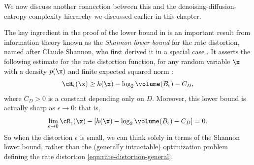 \documentclass[../../book-main.tex]{subfiles}
\begin{document}
We now discuss another connection between this and the
denoising-diffusion-entropy complexity hierarchy we discussed earlier in this
chapter.

\begin{remark}\label{rem:slb}
	The key ingredient in the proof of the lower bound in
	 is an important result from
	information theory known as the \textit{Shannon lower bound} for the rate
	distortion, named after Claude Shannon, who first derived it in a special case
	\cite{shannon1959coding}. It
	asserts the following estimate for the rate distortion function, for any random
	variable $\x$ with
	a density $p(\x)$ and finite expected squared norm \cite{Linder1994-ej}:
	\begin{equation}\label{eq:slb}
		\cR_{\epsilon}(\x)
		\geq
		h(\x)
		- \log_2 \volume(B_{\epsilon})
		-
		C_D,
	\end{equation}
	where $C_D > 0$ is a constant depending only on $D$. Moreover, this lower bound
	is actually sharp as $\epsilon \to 0$: that is,
	\begin{equation}
		\lim_{\epsilon \to 0} \cR_{\epsilon}(\x) - \left[ h(\x) - \log_2
		\volume(B_{\epsilon}) - C_D\right] = 0.
	\end{equation}
	So when the distortion $\epsilon$ is small, we can think solely in terms of
	the Shannon lower bound, rather than the (generally intractable)
	optimization problem defining the rate distortion
	\eqref{eqn:rate-distortion-general}.


\end{remark}
\end{document}
